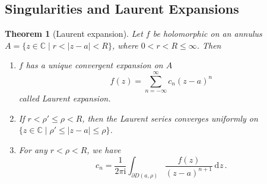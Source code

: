 \documentclass{article}
\theoremstyle{plain}\theoremheaderfont{\normalfont\itshape}\theorembodyfont{\rmfamily}\theoremseparator{.}\newtheorem*{rem}{Remark}\newtheorem*{ex}{Example}\newtheorem*{proof}{Proof}\newtheorem*{altp}{Alternative proof}\newtheorem*{con}{Consequences}\newtheorem*{notn}{Notations}\newtheorem*{cau}{Caution}\newtheorem*{term}{Terminology}\newtheorem*{keyex}{Key example}
\theoremstyle{plain}\theoremheaderfont{\normalfont\bfseries}\theorembodyfont{\rmfamily}\theoremseparator{.}\newtheorem{thm}{Theorem}[section]\newtheorem{lem}[thm]{Lemma}\newtheorem{prop}[thm]{Proposition}\newtheorem*{cor}{Corollary}\newtheorem{defn}[thm]{Definition}\newtheorem{clm}[thm]{Claim}\newtheorem{clminproof}{Claim}\newtheorem{leminproof}{Lemma}\newtheorem{app}{Application}
\theoremstyle{break}\theoremheaderfont{\normalfont\itshape}\theorembodyfont{\rmfamily}\theoremseparator{.\medskip}\newtheorem*{proofskip}{Proof}\newtheorem*{exs}{Examples}\newtheorem*{rems}{Remarks}\newtheorem*{rec}{Recall}\newtheorem*{ppts}{Properties}
\theoremstyle{break}\theoremheaderfont{\normalfont\bfseries}\theorembodyfont{\rmfamily}\theoremseparator{.\medskip}\newtheorem{lemskip}[thm]{Lemma}\newtheorem{defnskip}[thm]{Definition}\newtheorem{propskip}[thm]{Proposition}\newtheorem{thmskip}[thm]{Theorem}
\numberwithin{equation}{section}
\newcommand{\ii}{\mathrm{i}}
\newcommand{\abs}[1]{\left|#1\right|}
\newcommand{\dd}[2][]{\,\mathrm{d}^{#1} #2}
\newcommand{\CC}{\mathbb{C}}
\begin{document}
    \subsection{Singularities and Laurent Expansions}
    \begin{thm}[Laurent expansion]
        Let \(f\) be holomorphic on an annulus \(A=\{z\in\CC\mid r<\abs{z-a}<R\}\), where \(0<r<R\le\infty\). Then
        \begin{enumerate}[topsep=0pt,label=(\roman*)]
            \item \(f\) has a unique convergent expansion on \(A\)
            \[f(z)=\sum_{n=-\infty}^{\infty}c_n(z-a)^n\]
            called \textit{Laurent expansion}.
            \item If \(r<\rho'\le\rho<R\), then the Laurent series converges uniformly on \(\{z\in\CC\mid\rho'\le\abs{z-a}\le\rho\}\).
            \item For any \(r<\rho<R\), we have
            \[c_n=\frac{1}{2\pi \ii}\int_{\partial D(a,\rho)}\frac{f(z)}{(z-a)^{n+1}}\dd{z}\,.\]
        \end{enumerate}
    \end{thm}
\end{document}
